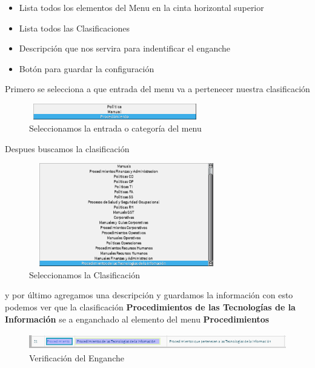 \documentclass[12pt,letterpaper]{article}
\begin{document}
{\begin{subsection}{\color{blackgreen}}
          			\begin{itemize}
          				\item[\ding{182}]
          				{
          					Lista todos los elementos del Menu en la cinta horizontal superior
          				}
          				\item[\ding{183}]
          				{
          					Lista todos las Clasificaciones
          				}
          				\item[\ding{184}]
          				{
          					Descripci\'on que nos servira para indentificar el enganche
          				}
                  \item[\ding{185}]
          				{
          					Bot\'on para guardar la configuraci\'on
          				}
          	   \end{itemize}
\newpage
      Primero se selecciona a que entrada del menu va a pertenecer nuestra clasificaci\'on
          \begin{figure}[htb]
            \centering
            \includegraphics[angle=0,width=75mm,height=7mm]{img/Menu_049.png}
            \caption{Seleccionamos la entrada o categor\'ia del menu}
            \label{cat}
          \end{figure}

      Despues buscamos la clasificaci\'on
          \begin{figure}[htb]
            \centering
            \includegraphics[angle=0,width=85mm,height=45mm]{img/Menu_050.png}
            \caption{Seleccionamos la Clasificaci\'on}
            \label{clt}
          \end{figure}

\newpage
      y por \'ultimo agregamos una descripci\'on y guardamos la informaci\'on
      con esto podemos ver que la clasificaci\'on \textbf{Procedimientos de las Tecnolog\'ias de la Informaci\'on} se a enganchado al elemento del menu \textbf{Procedimientos}
          \begin{figure}[htb]
            \centering
            \includegraphics[angle=0,width=120mm,height=7mm]{img/Selection_051.png}
            \caption{Verificaci\'on del Enganche}
            \label{clta}
          \end{figure}


\end{subsection}}
\end{document}
